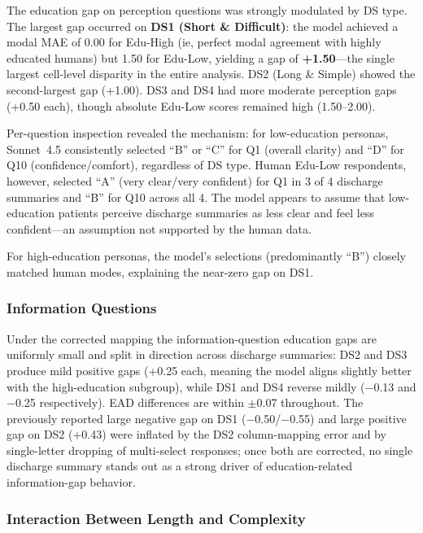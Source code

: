 The education gap on perception questions was strongly modulated by DS type.
The largest gap occurred on \textbf{DS1 (Short \& Difficult)}: the model achieved
a modal MAE of 0.00 for Edu-High (ie, perfect modal agreement with highly educated
humans) but 1.50 for Edu-Low, yielding a gap of \textbf{+1.50}---the single largest
cell-level disparity in the entire analysis. DS2 (Long \& Simple) showed the
second-largest gap (+1.00). DS3 and DS4 had more moderate perception gaps (+0.50
each), though absolute Edu-Low scores remained high (1.50--2.00).

Per-question inspection revealed the mechanism: for low-education personas, Sonnet~4.5
consistently selected ``B'' or ``C'' for Q1 (overall clarity) and ``D'' for Q10
(confidence/comfort), regardless of DS type. Human Edu-Low respondents, however,
selected ``A'' (very clear/very confident) for Q1 in 3 of 4 discharge summaries
and ``B'' for Q10 across all 4. The model appears to assume that
low-education patients perceive discharge summaries as less clear and feel less
confident---an assumption not supported by the human data.

For high-education personas, the model's selections (predominantly ``B'') closely
matched human modes, explaining the near-zero gap on DS1.

\subsubsection{Information Questions}

Under the corrected mapping the information-question education
gaps are uniformly small and split in direction across discharge summaries:
DS2 and DS3 produce mild positive gaps (+0.25 each, meaning the model
aligns slightly better with the high-education subgroup), while DS1 and
DS4 reverse mildly ($-$0.13 and $-$0.25 respectively). EAD differences
are within $\pm$0.07 throughout. The previously reported large negative
gap on DS1 ($-$0.50/$-$0.55) and large positive gap on DS2 (+0.43) were
inflated by the DS2 column-mapping error and by single-letter dropping
of multi-select responses; once both are corrected, no single discharge
summary stands out as a strong driver of education-related information-gap
behavior.

\subsubsection{Interaction Between Length and Complexity}

